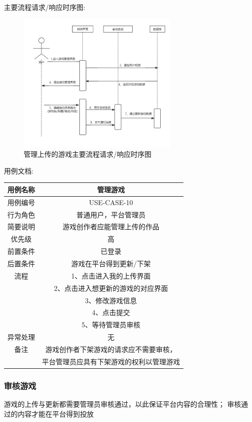 \documentclass[12pt]{ctexart} %
\begin{document}
主要流程请求/响应时序图:
\begin{figure}[h]
  \centering
  \includegraphics[width=0.7\textwidth]{yongli10.jpg}
  \caption{管理上传的游戏主要流程请求/响应时序图}
\end{figure}
用例文档:

\begin{tabular}{|c|c|}
  \hline
  用例名称& 管理游戏\\
  \hline
  用例编号 & USE-CASE-10\\
  \hline
  行为角色 & 普通用户，平台管理员\\
  \hline
  简要说明 & 游戏创作者应能管理上传的作品\\
  \hline
  优先级 & 高\\
  \hline
  前置条件 & 已登录\\
  \hline
  后置条件 & 游戏在平台得到更新/下架\\
  \hline
  流程 & 1、点击进入我的上传界面\\
      &  2、点击进入想更新的游戏的对应界面\\
      &  3、修改游戏信息\\
      &  4、点击提交\\
      &  5、等待管理员审核\\
  \hline
  异常处理 & 无\\
  \hline
  备注 & 游戏创作者下架游戏的请求应不需要审核，\\
       & 平台管理员应具有下架游戏的权利以管理游戏\\
  \hline
\end{tabular}

\subsubsection{审核游戏}
游戏的上传与更新都需要管理员审核通过，以此保证平台内容的合理性；
审核通过的内容才能在平台得到投放
\end{document}
